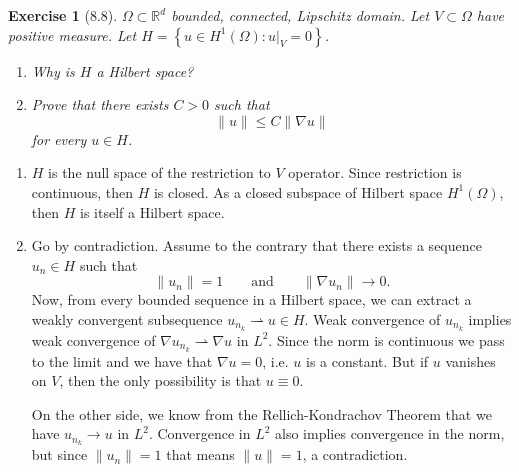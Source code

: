 \documentclass[letterpaper,twoside,11pt]{article}
\theoremstyle{mystyle}
\newtheorem*{exercise}{Exercise}
\newcommand{\R}{{\mathbb R}}
\begin{document}
\newpage 
\begin{exercise}[8.8]
  $\Omega \subset \R^d$ bounded, connected, Lipschitz domain. Let $V \subset \Omega$ have positive measure. Let $H = \left\{ u \in H^1 (\Omega) : u|_V = 0 \right\}$. 
  \begin{enumerate}
    \item Why is $H$ a Hilbert space? 
    \item Prove that there exists $C>0$ such that 
    \[\|u\| \leq C \|\nabla u\|\]
    for every $u \in H$. 
  \end{enumerate}
\end{exercise}

\begin{enumerate}
  \item $H$ is the null space of the restriction to $V$ operator. Since restriction is continuous, then $H$ is closed. As a closed subspace of Hilbert space $H^1\left( \Omega \right)$, then $H$ is itself a Hilbert space. 
  \item Go by contradiction. Assume to the contrary that there exists a sequence $u_n \in H$ such that 
  \[\|u_n\|= 1 \qquad \text{and} \qquad \|\nabla u_n\| \to 0.\]
  Now, from every bounded sequence in a Hilbert space, we can extract a weakly convergent subsequence $u_{n_k} \rightharpoonup u \in H$. Weak convergence of $u_{n_k}$ implies weak convergence of $\nabla u_{n_k} \rightharpoonup \nabla u$ in $L^2$. Since the norm is continuous we pass to the limit and we have that $\nabla u = 0$, i.e. $u$ is a constant. But if $u$ vanishes on $V$, then the only possibility is that $u \equiv 0$. 

  On the other side, we know from the Rellich-Kondrachov Theorem that we have $u_{n_k} \to u$ in $L^2$. Convergence in $L^2$ also implies convergence in the norm, but since $\|u_n\| = 1$ that means $\|u\| = 1$, a contradiction. 

\end{enumerate}
\end{document}
